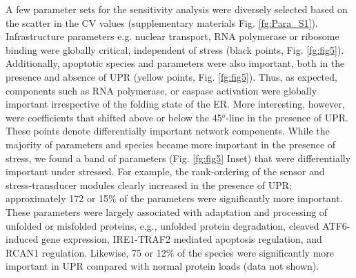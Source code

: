 \documentclass[fleqn,10pt]{wlscirep}
\begin{document}
A few parameter sets for the sensitivity analysis were diversely selected based on the scatter in the CV values (supplementary materials Fig. \ref{fg:Para_S1}). Infrastructure parameters e.g. nuclear transport, RNA polymerase or ribosome binding were globally critical, independent of stress (black points, Fig. \ref{fg:fig5}). Additionally, apoptotic species and parameters were also important, both in the presence and absence of UPR (yellow points, Fig. \ref{fg:fig5}). Thus, as expected, components such as RNA polymerase, or caspase activation were globally important irrespective of the folding state of the ER. More interesting, however, were coefficients that shifted above or below the 45$^{o}$-line in the presence of UPR. These points denote differentially important network components. While the majority of parameters and species became more important in the presence of stress, we found a band of parameters (Fig. \ref{fg:fig5} Inset) that were differentially important under stressed. For example, the rank-ordering of the sensor and stress-transducer modules clearly increased in the presence of UPR; approximately 172 or 15\% of the parameters were significantly more important. These parameters were largely associated with adaptation and processing of unfolded or misfolded proteins, e.g., unfolded protein degradation, cleaved ATF6-induced gene expression, IRE1-TRAF2 mediated apoptosis regulation, and RCAN1 regulation. Likewise, 75 or 12\% of the species were significantly more important in UPR compared with normal protein loads (data not shown).
\end{document}
